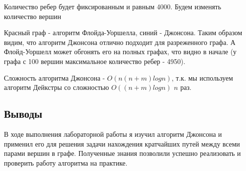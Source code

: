 \documentclass[12pt]{article}
\begin{document}
Количество ребер будет фиксированным и равным 4000. Будем изменять количество вершин


Красный граф - алгоритм Флойда-Уоршелла, синий - Джонсона.
Таким образом видим, что алгоритм Джонсона отлично подходит для разреженного графа. А Флойд-Уоршелл может обгонять его на полных графах, что видно в начале (у графа с 100 вершин максимальное количество ребер - 4950).

Сложность алгоритма Джонсона - $O(n(n+m)logn)$, т.к. мы используем алгоритм Дейкстры со сложностью $O((n+m)logn)$ $n$ раз.


\subsection*{Выводы}
В ходе выполнения лабораторной работы я изучил алгоритм Джонсона и применил его для решения задачи нахождения кратчайших путей между всеми парами вершин в графе. Полученные знания позволили успешно реализовать и проверить работу алгоритма на практике.
\end{document}
